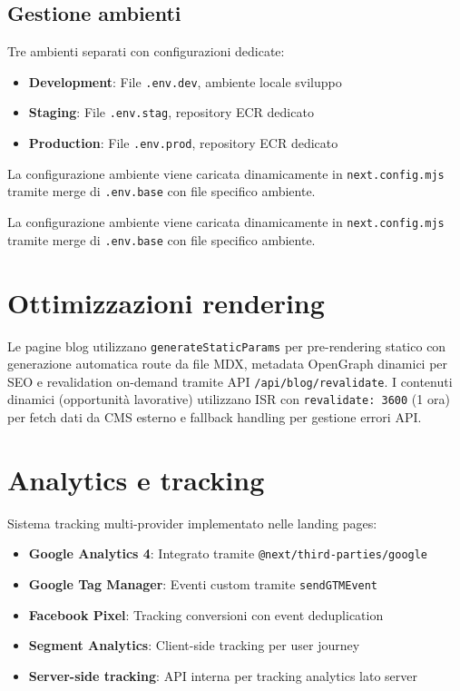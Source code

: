 \subsection{Gestione ambienti}

Tre ambienti separati con configurazioni dedicate:
\begin{itemize}
  \item \textbf{Development}: File \texttt{.env.dev}, ambiente locale sviluppo
  \item \textbf{Staging}: File \texttt{.env.stag}, repository ECR dedicato
  \item \textbf{Production}: File \texttt{.env.prod}, repository ECR dedicato
\end{itemize}

La configurazione ambiente viene caricata dinamicamente in
\texttt{next.config.mjs} tramite merge di \texttt{.env.base} con file
specifico ambiente.

La configurazione ambiente viene caricata dinamicamente in
\texttt{next.config.mjs} tramite merge di \texttt{.env.base} con file
specifico ambiente.

\section{Ottimizzazioni rendering}

Le pagine blog utilizzano \texttt{generateStaticParams} per pre-rendering
statico con generazione automatica route da file MDX, metadata OpenGraph
dinamici per SEO e revalidation on-demand tramite API
\texttt{/api/blog/revalidate}. I contenuti dinamici (opportunità lavorative)
utilizzano ISR con \texttt{revalidate: 3600} (1 ora) per fetch dati da CMS
esterno e fallback handling per gestione errori API.

\section{Analytics e tracking}

Sistema tracking multi-provider implementato nelle landing pages:
\begin{itemize}
  \item \textbf{Google Analytics 4}: Integrato tramite
\texttt{@next/third-parties/google}
  \item \textbf{Google Tag Manager}: Eventi custom tramite
\texttt{sendGTMEvent}
  \item \textbf{Facebook Pixel}: Tracking conversioni con event
deduplication
  \item \textbf{Segment Analytics}: Client-side tracking per user journey
  \item \textbf{Server-side tracking}: API interna per tracking analytics
lato server
\end{itemize}

